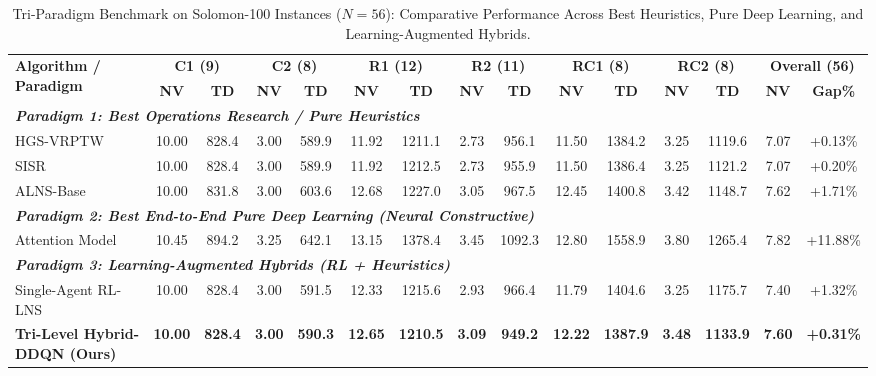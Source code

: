 \begin{table}[!t]
\caption{Tri-Paradigm Benchmark on Solomon-100 Instances ($N=56$): Comparative Performance Across Best Heuristics, Pure Deep Learning, and Learning-Augmented Hybrids.}
\label{tab:solomon_tri_paradigm}
\centering
\footnotesize
\setlength{\tabcolsep}{3.8pt}
\begin{tabular*}{\textwidth}{@{\extracolsep{\fill}} l cc cc cc cc cc cc cc @{}}
\toprule
\multirow{2}{*}{\textbf{Algorithm / Paradigm}} & \multicolumn{2}{c}{\textbf{C1 (9)}} & \multicolumn{2}{c}{\textbf{C2 (8)}} & \multicolumn{2}{c}{\textbf{R1 (12)}} & \multicolumn{2}{c}{\textbf{R2 (11)}} & \multicolumn{2}{c}{\textbf{RC1 (8)}} & \multicolumn{2}{c}{\textbf{RC2 (8)}} & \multicolumn{2}{c}{\textbf{Overall (56)}} \\
\cmidrule(lr){2-3} \cmidrule(lr){4-5} \cmidrule(lr){6-7} \cmidrule(lr){8-9} \cmidrule(lr){10-11} \cmidrule(lr){12-13} \cmidrule(lr){14-15}
 & \textbf{NV} & \textbf{TD} & \textbf{NV} & \textbf{TD} & \textbf{NV} & \textbf{TD} & \textbf{NV} & \textbf{TD} & \textbf{NV} & \textbf{TD} & \textbf{NV} & \textbf{TD} & \textbf{NV} & \textbf{Gap\%} \\
\midrule
\multicolumn{15}{l}{\textit{\textbf{Paradigm 1: Best Operations Research / Pure Heuristics}}} \\
HGS-VRPTW \cite{vidal2013hybrid} & 10.00 & 828.4 & 3.00 & 589.9 & 11.92 & 1211.1 & 2.73 & 956.1 & 11.50 & 1384.2 & 3.25 & 1119.6 & 7.07 & +0.13\% \\
SISR \cite{christiaens2020slack} & 10.00 & 828.4 & 3.00 & 589.9 & 11.92 & 1212.5 & 2.73 & 955.9 & 11.50 & 1386.4 & 3.25 & 1121.2 & 7.07 & +0.20\% \\
ALNS-Base \cite{Ropke2006} & 10.00 & 831.8 & 3.00 & 603.6 & 12.68 & 1227.0 & 3.05 & 967.5 & 12.45 & 1400.8 & 3.42 & 1148.7 & 7.62 & +1.71\% \\
\midrule
\multicolumn{15}{l}{\textit{\textbf{Paradigm 2: Best End-to-End Pure Deep Learning (Neural Constructive)}}} \\
Attention Model \cite{kool2019attention,lin2021neural} & 10.45 & 894.2 & 3.25 & 642.1 & 13.15 & 1378.4 & 3.45 & 1092.3 & 12.80 & 1558.9 & 3.80 & 1265.4 & 7.82 & +11.88\% \\
\midrule
\multicolumn{15}{l}{\textit{\textbf{Paradigm 3: Learning-Augmented Hybrids (RL + Heuristics)}}} \\
Single-Agent RL-LNS \cite{lu2020learning,son2023learning} & 10.00 & 828.4 & 3.00 & 591.5 & 12.33 & 1215.6 & 2.93 & 966.4 & 11.79 & 1404.6 & 3.25 & 1175.7 & 7.40 & +1.32\% \\
\textbf{Tri-Level Hybrid-DDQN (Ours)} & \textbf{10.00} & \textbf{828.4} & \textbf{3.00} & \textbf{590.3} & \textbf{12.65} & \textbf{1210.5} & \textbf{3.09} & \textbf{949.2} & \textbf{12.22} & \textbf{1387.9} & \textbf{3.48} & \textbf{1133.9} & \textbf{7.60} & \textbf{+0.31\%} \\
\bottomrule
\end{tabular*}
\end{table}

